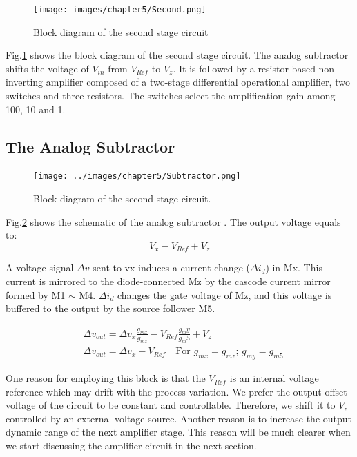 {\begin{figure}[!htbp]
    \centering
        \texttt{[image: images/chapter5/Second.png]}
    \caption{Block diagram of the second stage circuit}
    \label{fig:secondStage}
\end{figure}
Fig.\ref{fig:secondStage} shows the block diagram of the second stage circuit.
The analog subtractor shifts the voltage of $V_{in}$ from $V_{Ref}$ to $V_z$.
It is followed by a resistor-based non-inverting amplifier composed of a two-stage differential operational amplifier, two switches and three resistors.
The switches select the amplification gain among 100, 10 and 1.

\subsection{The Analog Subtractor} \label{sec:sub}

\begin{figure}[!htbp]
    \centering
        \texttt{[image: ../images/chapter5/Subtractor.png]}
    \caption{Block diagram of the second stage circuit.}
    \label{fig:subtractor}
\end{figure}

Fig.\ref{fig:subtractor} shows the schematic of the analog subtractor \cite{Tsubtractor}.
The output voltage equals to:
\begin{equation}
    V_x - V_{Ref} + V_z
\end{equation}

A voltage signal $\Delta v$ sent to vx induces a current change ($\Delta i_d$) in Mx.
This current is mirrored to the diode-connected Mz by the cascode current mirror formed by M1 $\sim$ M4.
$\Delta i_d$ changes the gate voltage of Mz, and this voltage is buffered to the output by the source follower M5.

\begin{align}
    & \Delta v_{out} = \Delta v_{x}\frac{g_{mx}}{g_{mz}} - V_{Ref}\frac{g_my}{g_m5} + V_z\\
    & \Delta v_{out} = \Delta v_{x} - V_{Ref} \quad \text{For $g_{mx} = g_{mz}$; $g_{my} = g_{m5}$}
\end{align}

One reason for employing this block is that the $V_{Ref}$ is an internal voltage reference which may drift with the process variation.
We prefer the output offset voltage of the circuit to be constant and controllable.
Therefore, we shift it to $V_z$ controlled by an external voltage source.
Another reason is to increase the output dynamic range of the next amplifier stage.
This reason will be much clearer when we start discussing the amplifier circuit in the next section.

}
